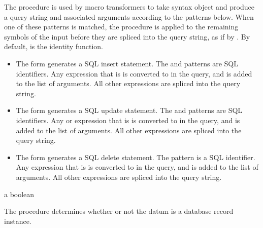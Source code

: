 The  procedure is used by macro transformers to take
syntax object  and produce a query string and associated
arguments according to the patterns below.
When one of these patterns is matched, the  procedure is
applied to the remaining symbols of the input before they are spliced into the
query string, as if by .
By default,  is the identity function.

\begin{itemize}

\item {}

  The  form generates a SQL insert statement. The
   and  patterns are SQL identifiers. Any
   expression that is  is converted
  to  in the query, and  is added to the list of
  arguments. All other expressions are spliced into the query string.

\item {}

  The  form generates a SQL update statement. The
   and  patterns are SQL identifiers. Any
   or  expression that is  is converted to  in the query, and 
  is added to the list of arguments. All other expressions are spliced
  into the query string.

\item {}

  The  form generates a SQL delete statement. The
   pattern is a SQL identifier. Any  expression
  that is  is converted to  in
  the query, and  is added to the list of arguments. All
  other expressions are spliced into the query string.

\end{itemize}

\begin{procedure}
\end{procedure}
\returns{} a boolean

The  procedure determines whether or not the datum
 is a database record instance.

